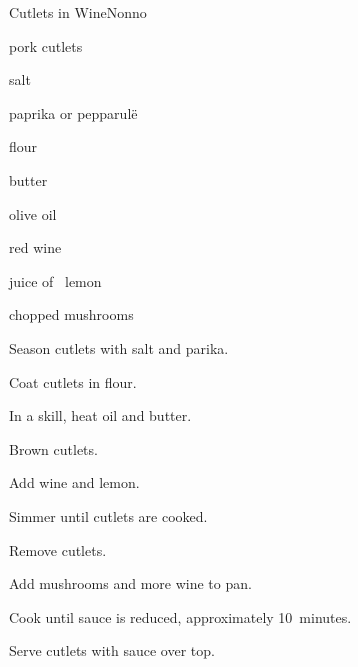 \begin{recipe}{Cutlets in Wine}{Nonno}{}

\begin{ingredients}
\item pork cutlets
\item salt
\item paprika or pepparul\"e
\item flour
\item butter
\item olive oil
\item red wine
\item juice of \half{}~lemon
\item chopped mushrooms
\end{ingredients}

\begin{directions}
\item Season cutlets with salt and parika.
\item Coat cutlets in flour.
\item In a skill, heat oil and butter.
\item Brown cutlets.
\item Add wine and lemon.
\item Simmer until cutlets are cooked.
\item Remove cutlets.
\item Add mushrooms and more wine to pan.
\item Cook until sauce is reduced, approximately 10~minutes.
\item Serve cutlets with sauce over top.
\end{directions}

\end{recipe}
